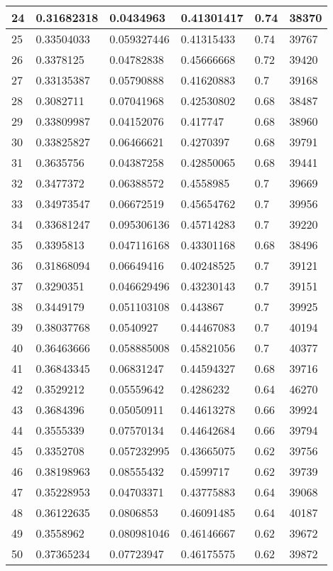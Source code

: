 \begin{longtable}{|l|l|l|l|l|l|}
24 & 0.31682318 & 0.0434963 & 0.41301417 & 0.74 & 38370 \\ \hline 
25 & 0.33504033 & 0.059327446 & 0.41315433 & 0.74 & 39767 \\ \hline 
26 & 0.3378125 & 0.04782838 & 0.45666668 & 0.72 & 39420 \\ \hline 
27 & 0.33135387 & 0.05790888 & 0.41620883 & 0.7 & 39168 \\ \hline 
28 & 0.3082711 & 0.07041968 & 0.42530802 & 0.68 & 38487 \\ \hline 
29 & 0.33809987 & 0.04152076 & 0.417747 & 0.68 & 38960 \\ \hline 
30 & 0.33825827 & 0.06466621 & 0.4270397 & 0.68 & 39791 \\ \hline 
31 & 0.3635756 & 0.04387258 & 0.42850065 & 0.68 & 39441 \\ \hline 
32 & 0.3477372 & 0.06388572 & 0.4558985 & 0.7 & 39669 \\ \hline 
33 & 0.34973547 & 0.06672519 & 0.45654762 & 0.7 & 39956 \\ \hline 
34 & 0.33681247 & 0.095306136 & 0.45714283 & 0.7 & 39220 \\ \hline 
35 & 0.3395813 & 0.047116168 & 0.43301168 & 0.68 & 38496 \\ \hline 
36 & 0.31868094 & 0.06649416 & 0.40248525 & 0.7 & 39121 \\ \hline 
37 & 0.3290351 & 0.046629496 & 0.43230143 & 0.7 & 39151 \\ \hline 
38 & 0.3449179 & 0.051103108 & 0.443867 & 0.7 & 39925 \\ \hline 
39 & 0.38037768 & 0.0540927 & 0.44467083 & 0.7 & 40194 \\ \hline 
40 & 0.36463666 & 0.058885008 & 0.45821056 & 0.7 & 40377 \\ \hline 
41 & 0.36843345 & 0.06831247 & 0.44594327 & 0.68 & 39716 \\ \hline 
42 & 0.3529212 & 0.05559642 & 0.4286232 & 0.64 & 46270 \\ \hline 
43 & 0.3684396 & 0.05050911 & 0.44613278 & 0.66 & 39924 \\ \hline 
44 & 0.3555339 & 0.07570134 & 0.44642684 & 0.66 & 39794 \\ \hline 
45 & 0.3352708 & 0.057232995 & 0.43665075 & 0.62 & 39756 \\ \hline 
46 & 0.38198963 & 0.08555432 & 0.4599717 & 0.62 & 39739 \\ \hline 
47 & 0.35228953 & 0.04703371 & 0.43775883 & 0.64 & 39068 \\ \hline 
48 & 0.36122635 & 0.0806853 & 0.46091485 & 0.64 & 40187 \\ \hline 
49 & 0.3558962 & 0.080981046 & 0.46146667 & 0.62 & 39672 \\ \hline 
50 & 0.37365234 & 0.07723947 & 0.46175575 & 0.62 & 39872 \\ \hline 
\end{longtable}